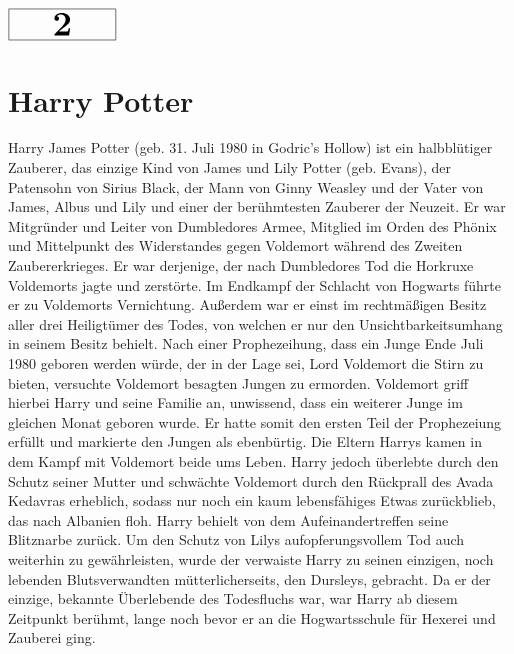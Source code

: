 \documentclass[a4paper, 10pt]{article}
\begin{document}
\begin{minipage}[t]{\textwidth}
    \vspace*{-1.5cm} %
    \begin{flushright}
        \hspace*{\fill} %
        $\boxed{\textbf{\Huge\phantom{00}2\phantom{00}}}$ %
    \end{flushright}
\end{minipage}
\section*{\huge Harry Potter}
Harry James Potter (geb. 31. Juli 1980 in Godric's Hollow) ist ein halbblütiger Zauberer, das einzige Kind von James und Lily Potter (geb. Evans), der Patensohn von Sirius Black, der Mann von Ginny Weasley und der Vater von James, Albus und Lily und einer der berühmtesten Zauberer der Neuzeit.
\vspace{10pt}
\newline
{}  
Er war Mitgründer und Leiter von Dumbledores Armee, Mitglied im Orden des Phönix und Mittelpunkt des Widerstandes gegen Voldemort während des Zweiten Zaubererkrieges. Er war derjenige, der nach Dumbledores Tod die Horkruxe Voldemorts jagte und zerstörte. Im Endkampf der Schlacht von Hogwarts führte er zu Voldemorts Vernichtung. Außerdem war er einst im rechtmäßigen Besitz aller drei Heiligtümer des Todes, von welchen er nur den Unsichtbarkeitsumhang in seinem Besitz behielt.
\vspace{10pt}
\newline
{}  
Nach einer Prophezeihung, dass ein Junge Ende Juli 1980 geboren werden würde, der in der Lage sei, Lord Voldemort die Stirn zu bieten, versuchte Voldemort besagten Jungen zu ermorden. Voldemort griff hierbei Harry und seine Familie an, unwissend, dass ein weiterer Junge im gleichen Monat geboren wurde. Er hatte somit den ersten Teil der Prophezeiung erfüllt und markierte den Jungen als ebenbürtig. Die Eltern Harrys kamen in dem Kampf mit Voldemort beide ums Leben. Harry jedoch überlebte durch den Schutz seiner Mutter und schwächte Voldemort durch den Rückprall des Avada Kedavras erheblich, sodass nur noch ein kaum lebensfähiges Etwas zurückblieb, das nach Albanien floh.
\vspace{10pt}
\newline
{}  
Harry behielt von dem Aufeinandertreffen seine Blitznarbe zurück. Um den Schutz von Lilys aufopferungsvollem Tod auch weiterhin zu gewährleisten, wurde der verwaiste Harry zu seinen einzigen, noch lebenden Blutsverwandten mütterlicherseits, den Dursleys, gebracht. Da er der einzige, bekannte Überlebende des Todesfluchs war, war Harry ab diesem Zeitpunkt berühmt, lange noch bevor er an die Hogwartsschule für Hexerei und Zauberei ging.
\end{document}
